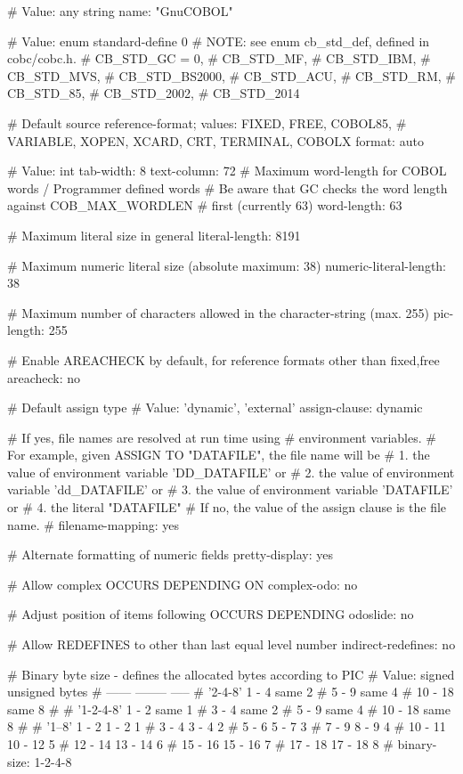 

# Value: any string
name: "GnuCOBOL"

# Value: enum
standard-define			0
# NOTE: see enum cb_std_def, defined in cobc/cobc.h.
#        CB_STD_GC = 0,
#        CB_STD_MF,
#        CB_STD_IBM,
#        CB_STD_MVS,
#        CB_STD_BS2000,
#        CB_STD_ACU,
#        CB_STD_RM,
#        CB_STD_85,
#        CB_STD_2002,
#        CB_STD_2014

# Default source reference-format; values: FIXED, FREE, COBOL85,
# VARIABLE, XOPEN, XCARD, CRT, TERMINAL, COBOLX
format:				auto

# Value: int
tab-width:			8
text-column:			72
# Maximum word-length for COBOL words / Programmer defined words
# Be aware that GC checks the word length against COB_MAX_WORDLEN
# first (currently 63)
word-length:			63

# Maximum literal size in general
literal-length:			8191

# Maximum numeric literal size (absolute maximum: 38)
numeric-literal-length:		38

# Maximum number of characters allowed in the character-string (max. 255)
pic-length:			255

# Enable AREACHECK by default, for reference formats other than {fixed,free}
areacheck:			no

# Default assign type
# Value: 'dynamic', 'external'
assign-clause:			dynamic

# If yes, file names are resolved at run time using
# environment variables.
# For example, given ASSIGN TO "DATAFILE", the file name will be
#  1. the value of environment variable 'DD_DATAFILE' or
#  2. the value of environment variable 'dd_DATAFILE' or
#  3. the value of environment variable 'DATAFILE' or
#  4. the literal "DATAFILE"
# If no, the value of the assign clause is the file name.
#
filename-mapping:		yes

# Alternate formatting of numeric fields
pretty-display:			yes

# Allow complex OCCURS DEPENDING ON
complex-odo:			no

# Adjust position of items following OCCURS DEPENDING
odoslide:			no

# Allow REDEFINES to other than last equal level number
indirect-redefines:		no

# Binary byte size - defines the allocated bytes according to PIC
# Value:         signed  unsigned  bytes
#                ------  --------  -----
# '2-4-8'        1 -  4    same        2
#                5 -  9    same        4
#               10 - 18    same        8
#
# '1-2-4-8'      1 -  2    same        1
#                3 -  4    same        2
#                5 -  9    same        4
#               10 - 18    same        8
#
# '1--8'         1 -  2    1 -  2      1
#                3 -  4    3 -  4      2
#                5 -  6    5 -  7      3
#                7 -  9    8 -  9      4
#               10 - 11   10 - 12      5
#               12 - 14   13 - 14      6
#               15 - 16   15 - 16      7
#               17 - 18   17 - 18      8
#
binary-size:			1-2-4-8

